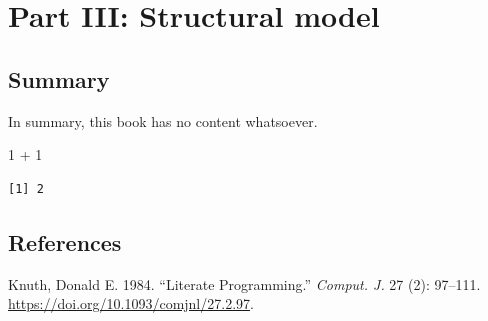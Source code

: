 \documentclass[
  letterpaper,
  DIV=11,
  numbers=noendperiod]{scrreprt}
\newenvironment{Shaded}{\begin{snugshade}}{\end{snugshade}}
\newcommand{\DecValTok}[1]{\textcolor[rgb]{0.68,0.00,0.00}{#1}}
\newcommand{\SpecialCharTok}[1]{\textcolor[rgb]{0.37,0.37,0.37}{#1}}
\newlength{\cslhangindent}
\newenvironment{CSLReferences}[2] %
 {\begin{list}{}{%
  \setlength{\itemindent}{0pt}
  \setlength{\leftmargin}{0pt}
  \setlength{\parsep}{0pt}
  \ifodd #1
   \setlength{\leftmargin}{\cslhangindent}
   \setlength{\itemindent}{-1\cslhangindent}
  \fi
  \setlength{\itemsep}{#2\baselineskip}}}
 {\end{list}}
\begin{document}
\part{Part III: Structural model}


\chapter{Summary}\label{summary}

In summary, this book has no content whatsoever.

\begin{Shaded}
\begin{Highlighting}[]
\DecValTok{1} \SpecialCharTok{+} \DecValTok{1}
\end{Highlighting}
\end{Shaded}

\begin{verbatim}
[1] 2
\end{verbatim}


\chapter*{References}\label{references}


\label{refs}
\begin{CSLReferences}{1}{0}
Knuth, Donald E. 1984. {``Literate Programming.''} \emph{Comput. J.} 27
(2): 97--111. \url{https://doi.org/10.1093/comjnl/27.2.97}.

\end{CSLReferences}
\end{document}
